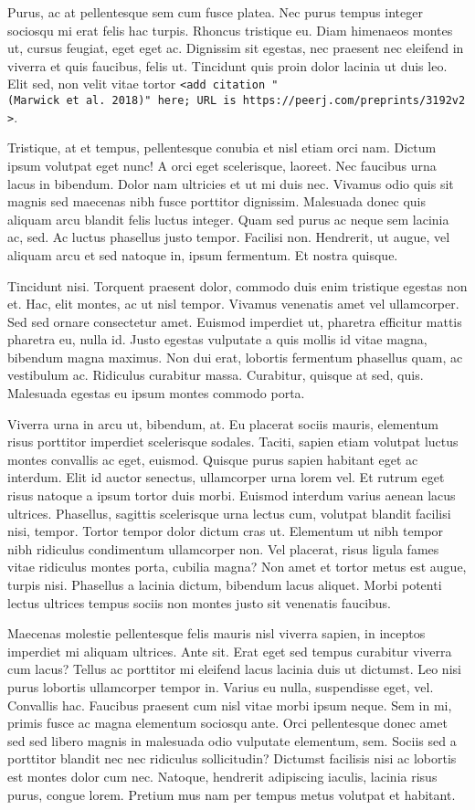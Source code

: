 \documentclass[
  11pt,
]{report}
\begin{document}
Purus, ac at pellentesque sem cum fusce platea. Nec purus tempus integer
sociosqu mi erat felis hac turpis. Rhoncus tristique eu. Diam himenaeos
montes ut, cursus feugiat, eget eget ac. Dignissim sit egestas, nec
praesent nec eleifend in viverra et quis faucibus, felis ut. Tincidunt
quis proin dolor lacinia ut duis leo. Elit sed, non velit vitae tortor
\texttt{\textless{}add\ citation\ "(Marwick\ et\ al.\ 2018)"\ here;\ URL\ is\ https://peerj.com/preprints/3192v2\textgreater{}}.

Tristique, at et tempus, pellentesque conubia et nisl etiam orci nam.
Dictum ipsum volutpat eget nunc! A orci eget scelerisque, laoreet. Nec
faucibus urna lacus in bibendum. Dolor nam ultricies et ut mi duis nec.
Vivamus odio quis sit magnis sed maecenas nibh fusce porttitor
dignissim. Malesuada donec quis aliquam arcu blandit felis luctus
integer. Quam sed purus ac neque sem lacinia ac, sed. Ac luctus
phasellus justo tempor. Facilisi non. Hendrerit, ut augue, vel aliquam
arcu et sed natoque in, ipsum fermentum. Et nostra quisque.

Tincidunt nisi. Torquent praesent dolor, commodo duis enim tristique
egestas non et. Hac, elit montes, ac ut nisl tempor. Vivamus venenatis
amet vel ullamcorper. Sed sed ornare consectetur amet. Euismod imperdiet
ut, pharetra efficitur mattis pharetra eu, nulla id. Justo egestas
vulputate a quis mollis id vitae magna, bibendum magna maximus. Non dui
erat, lobortis fermentum phasellus quam, ac vestibulum ac. Ridiculus
curabitur massa. Curabitur, quisque at sed, quis. Malesuada egestas eu
ipsum montes commodo porta.

Viverra urna in arcu ut, bibendum, at. Eu placerat sociis mauris,
elementum risus porttitor imperdiet scelerisque sodales. Taciti, sapien
etiam volutpat luctus montes convallis ac eget, euismod. Quisque purus
sapien habitant eget ac interdum. Elit id auctor senectus, ullamcorper
urna lorem vel. Et rutrum eget risus natoque a ipsum tortor duis morbi.
Euismod interdum varius aenean lacus ultrices. Phasellus, sagittis
scelerisque urna lectus cum, volutpat blandit facilisi nisi, tempor.
Tortor tempor dolor dictum cras ut. Elementum ut nibh tempor nibh
ridiculus condimentum ullamcorper non. Vel placerat, risus ligula fames
vitae ridiculus montes porta, cubilia magna? Non amet et tortor metus
est augue, turpis nisi. Phasellus a lacinia dictum, bibendum lacus
aliquet. Morbi potenti lectus ultrices tempus sociis non montes justo
sit venenatis faucibus.

Maecenas molestie pellentesque felis mauris nisl viverra sapien, in
inceptos imperdiet mi aliquam ultrices. Ante sit. Erat eget sed tempus
curabitur viverra cum lacus? Tellus ac porttitor mi eleifend lacus
lacinia duis ut dictumst. Leo nisi purus lobortis ullamcorper tempor in.
Varius eu nulla, suspendisse eget, vel. Convallis hac. Faucibus praesent
cum nisl vitae morbi ipsum neque. Sem in mi, primis fusce ac magna
elementum sociosqu ante. Orci pellentesque donec amet sed sed libero
magnis in malesuada odio vulputate elementum, sem. Sociis sed a
porttitor blandit nec nec ridiculus sollicitudin? Dictumst facilisis
nisi ac lobortis est montes dolor cum nec. Natoque, hendrerit adipiscing
iaculis, lacinia risus purus, congue lorem. Pretium mus nam per tempus
metus volutpat et habitant.
\end{document}
